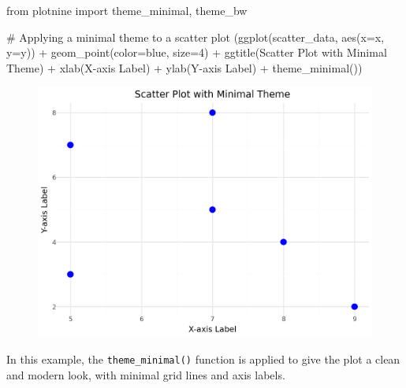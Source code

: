 \documentclass[
  letterpaper,
  DIV=11,
  numbers=noendperiod]{scrreprt}
\newenvironment{Shaded}{\begin{snugshade}}{\end{snugshade}}
\newcommand{\CommentTok}[1]{\textcolor[rgb]{0.37,0.37,0.37}{#1}}
\newcommand{\DecValTok}[1]{\textcolor[rgb]{0.68,0.00,0.00}{#1}}
\newcommand{\ImportTok}[1]{\textcolor[rgb]{0.00,0.46,0.62}{#1}}
\newcommand{\NormalTok}[1]{\textcolor[rgb]{0.00,0.23,0.31}{#1}}
\newcommand{\OperatorTok}[1]{\textcolor[rgb]{0.37,0.37,0.37}{#1}}
\newcommand{\StringTok}[1]{\textcolor[rgb]{0.13,0.47,0.30}{#1}}
\begin{document}
\begin{Shaded}
\begin{Highlighting}[]
\ImportTok{from}\NormalTok{ plotnine }\ImportTok{import}\NormalTok{ theme\_minimal, theme\_bw}

\CommentTok{\# Applying a minimal theme to a scatter plot}
\NormalTok{(ggplot(scatter\_data, aes(x}\OperatorTok{=}\StringTok{\textquotesingle{}x\textquotesingle{}}\NormalTok{, y}\OperatorTok{=}\StringTok{\textquotesingle{}y\textquotesingle{}}\NormalTok{)) }\OperatorTok{+}
\NormalTok{ geom\_point(color}\OperatorTok{=}\StringTok{\textquotesingle{}blue\textquotesingle{}}\NormalTok{, size}\OperatorTok{=}\DecValTok{4}\NormalTok{) }\OperatorTok{+}
\NormalTok{ ggtitle(}\StringTok{\textquotesingle{}Scatter Plot with Minimal Theme\textquotesingle{}}\NormalTok{) }\OperatorTok{+}
\NormalTok{ xlab(}\StringTok{\textquotesingle{}X{-}axis Label\textquotesingle{}}\NormalTok{) }\OperatorTok{+}
\NormalTok{ ylab(}\StringTok{\textquotesingle{}Y{-}axis Label\textquotesingle{}}\NormalTok{) }\OperatorTok{+}
\NormalTok{ theme\_minimal())}
\end{Highlighting}
\end{Shaded}

\begin{figure}[H]

{\centering \includegraphics{15_Data_Vis_files/figure-pdf/cell-23-output-1.png}

}

\end{figure}

In this example, the \texttt{theme\_minimal()} function is applied to
give the plot a clean and modern look, with minimal grid lines and axis
labels.
\end{document}
